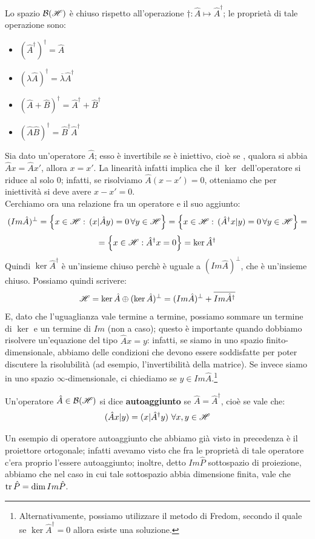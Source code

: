 \clearpage
Lo spazio $\mathcal{B}(\mathscr{H})$ è chiuso rispetto all'operazione $\dagger: \hat{A} \mapsto \hat{A}^{\dagger}$; le proprietà di tale operazione sono:
\begin{itemize}
\item $(\hat{A}^{\dagger})^{\dagger}= \hat{A}$
\item $( \lambda \hat{A})^{\dagger}= \overline{\lambda} \hat{A}^{\dagger}$
\item $(\hat{A} + \hat{B})^{\dagger}=\hat{A}^{\dagger} + \hat{B}^{\dagger}$
\item $(\hat{A} \hat{B})^{\dagger}=\hat{B}^{\dagger} \hat{A}^{\dagger}$
\end{itemize}
Sia dato un'operatore $\hat{A}$; esso è invertibile se è iniettivo, cioè se , qualora si abbia $\hat{A}x=\hat{A}x'$, allora $x=x'$. La linearità infatti implica che il $\ker$ dell'operatore si riduce al solo $0$; infatti, se risolviamo $\hat{A}(x-x')=0$, otteniamo che per iniettività si deve avere $x-x'=0$.\\
Cerchiamo ora una relazione fra un operatore e il suo aggiunto:
$$(Im \hat{A})^{\perp} = \left\{x \in \mathscr{H} : \, (x|\hat{A}y)=0 \, \forall y \in \mathscr{H} \right\} = \left\{x \in \mathscr{H} : \, (\hat{A} ^{\dagger}x|y)=0 \, \forall y \in \mathscr{H} \right\}=$$
$$=\left\{x \in \mathscr{H} : \hat{A}^{\dagger} x=0 \right\}= \ker \hat{A}^{\dagger}$$
Quindi $\ker \hat{A}^{\dagger}$ è un'insieme chiuso perchè è uguale a $(Im \hat{A})^{\perp}$, che è un'insieme chiuso. Possiamo quindi scrivere:
$$\mathscr{H}= \ker \hat{A} \oplus (\ker \hat{A})^{\perp}=(Im \hat{A})^{\perp} + \overline{Im \hat{A}^{\dagger}}$$
E, dato che l'uguaglianza vale termine a termine, possiamo sommare un termine di $\ker$ e un termine di $Im$ (non a caso); questo è importante quando dobbiamo risolvere un'equazione del tipo $\hat{A}x=y$: infatti, se siamo in uno spazio finito-dimensionale, abbiamo delle condizioni che devono essere soddisfatte per poter discutere la risolubilità (ad esempio, l'invertibilità della matrice). Se invece siamo in uno spazio $\infty$-dimensionale, ci chiediamo se $y \in Im \hat{A}$.\footnote{Alternativamente, possiamo utilizzare il metodo di Fredom, secondo il quale se $\ker \hat{A}^{\dagger}=0$ allora esiste una soluzione.}
\begin{definizione}
Un'operatore $\hat{A} \in \mathcal{B}(\mathscr{H})$ si dice \textbf{autoaggiunto} se $\hat{A}=\hat{A}^{\dagger}$, cioè se vale che:
$$(\hat{A}x|y)=(x|\hat{A}^{\dagger}y) \, \, \forall x, y \in \mathscr{H}$$
\end{definizione}
Un esempio di operatore autoaggiunto che abbiamo già visto in precedenza è il proiettore ortogonale; infatti avevamo visto che fra le proprietà di tale operatore c'era proprio l'essere autoaggiunto; inoltre, detto $Im \hat{P}$ sottospazio di proiezione, abbiamo che nel caso in cui tale sottospazio abbia dimensione finita, vale che $\operatorname{tr} \hat{P}=\dim Im \hat{P}$.
